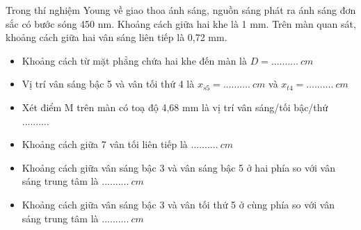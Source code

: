 \begin{vidu}%
Trong thí nghiệm Young về giao thoa ánh sáng, nguồn sáng phát ra ánh sáng đơn sắc có bước sóng 450 nm. Khoảng cách giữa hai khe là 1 mm. Trên màn quan sát, khoảng cách giữa hai vân sáng liên tiếp là 0,72 mm.
\begin{itemize}
\item[1.]  Khoảng cách từ mặt phẳng chứa hai khe đến màn là $D=..........\ cm$
\item[2.] Vị trí vân sáng bậc 5 và vân tối thứ 4 là $x_{s5}=..........\ cm$ và  $x_{t4}=..........\ cm$
\item[3.] Xét điểm M trên màn có toạ độ 4,68 mm là vị trí vân sáng/tối bậc/thứ .......... 
\item[4.] Khoảng cách giữa 7 vân tối liên tiếp là $..........\ cm$
\item[5.] Khoảng cách giữa vân sáng bậc 3 và vân sáng bậc 5 ở hai phía so với vân sáng trung tâm là $..........\ cm$
\item[6.] Khoảng cách giữa vân sáng bậc 3 và vân tối thứ 5 ở cùng phía so với vân sáng trung tâm là $..........\ cm$
\end{itemize}
\end{vidu} 

